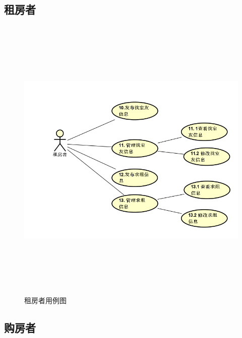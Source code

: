 \subsection{租房者}

\begin{figure}[htbp]

    \centering
    
    \includegraphics[height=14.0cm,width=14.0cm]{requirement/figures/zufangzhe.png} 
    \caption{租房者用例图}
    
    \end{figure}
    \newpage
\subsection{购房者}

